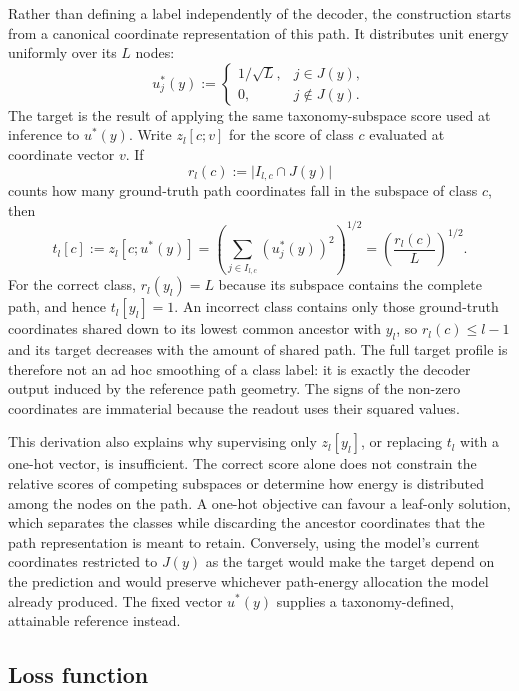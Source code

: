 Rather than defining a label independently of the decoder, the construction
starts from a canonical coordinate representation of this path. It distributes
unit energy uniformly over its $L$ nodes:
\[
u_j^*(y):=
\begin{cases}
1/\sqrt{L}, & j\in J(y),\\
0, & j\notin J(y).
\end{cases}
\]
The target is the result of applying the same taxonomy-subspace score used at
inference to $u^*(y)$. Write $z_l[c;v]$ for the score of class $c$ evaluated at
coordinate vector $v$. If
\[
r_l(c):=\bigl\lvert I_{l,c}\cap J(y)\bigr\rvert
\]
counts how many ground-truth path coordinates fall in the subspace of class
$c$, then
\begin{equation}
\label{eq:subspace_target}
t_l[c]
:=z_l[c;u^*(y)]
=\left(\sum_{j\in I_{l,c}}(u_j^*(y))^2\right)^{1/2}
=\left(\frac{r_l(c)}{L}\right)^{1/2}.
\end{equation}
For the correct class, $r_l(y_l)=L$ because its subspace contains the complete
path, and hence $t_l[y_l]=1$. An incorrect class contains only those
ground-truth coordinates shared down to its lowest common ancestor with $y_l$,
so $r_l(c)\leq l-1$ and its target decreases with the amount of shared path.
The full target profile is therefore not an ad hoc smoothing of a class label:
it is exactly the decoder output induced by the reference path geometry. The
signs of the non-zero coordinates are immaterial because the readout uses their
squared values.

This derivation also explains why supervising only $z_l[y_l]$, or replacing
$t_l$ with a one-hot vector, is insufficient. The correct score alone does not
constrain the relative scores of competing subspaces or determine how energy is
distributed among the nodes on the path. A one-hot objective can favour a
leaf-only solution, which separates the classes while discarding the ancestor
coordinates that the path representation is meant to retain. Conversely, using
the model's current coordinates restricted to $J(y)$ as the target would make
the target depend on the prediction and would preserve whichever path-energy
allocation the model already produced. The fixed vector $u^*(y)$ supplies a
taxonomy-defined, attainable reference instead.

\subsection{Loss function}
\label{ssec:subspace_loss}

